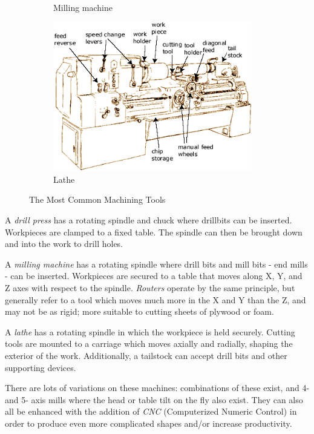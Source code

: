 \documentclass[10pt,letterpaper]{book}
\begin{document}
\begin{figure}[H]
\begin{subfigure}[b]{.34\linewidth}
		\caption{Milling machine}
	\end{subfigure}	\begin{subfigure}[b]{.4\linewidth}
		\includegraphics[width=0.95\textwidth]{imgs/lathe.png}
		\caption{Lathe}
	\end{subfigure}	
	
	\caption{The Most Common Machining Tools}
\end{figure}

 \begin{asparaenum}[a)]
 	\item A \textit{drill press} has a rotating spindle and chuck where drillbits can be inserted. Workpieces are clamped to a fixed table. The spindle can then be brought down and into the work to drill holes.
 	\item A \textit{milling machine} has a rotating spindle where drill bits and mill bits - end mills - can be inserted. Workpieces are secured to a table that moves along X, Y, and Z axes with respect to the spindle. \textit{Routers} operate by the same principle, but generally refer to a tool which moves much more in the X and Y than the Z, and may not be as rigid; more suitable to cutting sheets of plywood or foam.
 	\item A \textit{lathe} has a rotating spindle in which the workpiece is held securely. Cutting tools are mounted to a carriage which moves axially and radially, shaping the exterior of the work. Additionally, a tailstock can accept drill bits and other supporting devices.
 \end{asparaenum}
 
  There are lots of variations on these machines: combinations of these exist, and 4- and 5- axis mills where the head or table tilt on the fly also exist. They can also all be enhanced with the addition of \textit{CNC} (Computerized Numeric Control) in order to produce even more complicated shapes and/or increase productivity.
  
\end{document}
